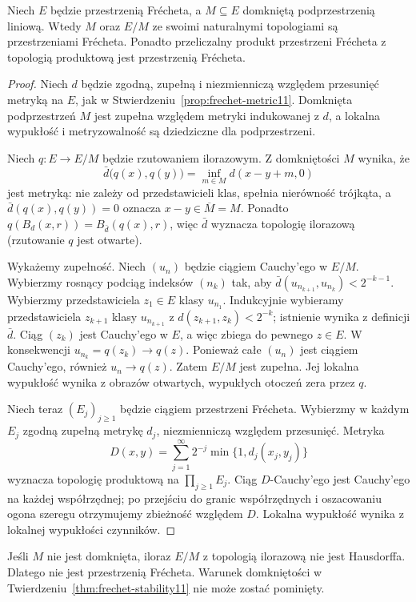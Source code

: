 \begin{twierdzenie}\label{thm:frechet-stability11}
Niech $E$ będzie przestrzenią Frécheta, a $M\subseteq E$
domkniętą podprzestrzenią liniową. Wtedy $M$ oraz $E/M$
ze swoimi naturalnymi topologiami są przestrzeniami Frécheta.
Ponadto przeliczalny produkt przestrzeni Frécheta z topologią
produktową jest przestrzenią Frécheta.
\end{twierdzenie}
\begin{proof}
Niech $d$ będzie zgodną, zupełną i niezmienniczą względem
przesunięć metryką na $E$, jak w Stwierdzeniu~\ref{prop:frechet-metric11}.
Domknięta podprzestrzeń $M$ jest zupełna względem metryki
indukowanej z $d$, a lokalna wypukłość i metryzowalność są
dziedziczne dla podprzestrzeni.

Niech $q:E\to E/M$ będzie rzutowaniem ilorazowym.
Z domkniętości $M$ wynika, że
\[
 \bar d\bigl(q(x),q(y)\bigr)=\inf_{m\in M}d(x-y+m,0)
\]
jest metryką: nie zależy od przedstawicieli klas, spełnia
nierówność trójkąta, a $\bar d(q(x),q(y))=0$ oznacza
$x-y\in\overline M=M$. Ponadto
$q(B_d(x,r))=B_{\bar d}(q(x),r)$, więc $\bar d$ wyznacza
topologię ilorazową (rzutowanie $q$ jest otwarte).

Wykażemy zupełność. Niech $(u_n)$ będzie ciągiem Cauchy'ego
w $E/M$. Wybierzmy rosnący podciąg indeksów $(n_k)$ tak,
aby $\bar d(u_{n_{k+1}},u_{n_k})<2^{-k-1}$.
Wybierzmy przedstawiciela $z_1\in E$ klasy $u_{n_1}$.
Indukcyjnie wybieramy przedstawiciela $z_{k+1}$ klasy
$u_{n_{k+1}}$ z $d(z_{k+1},z_k)<2^{-k}$;
istnienie wynika z definicji $\bar d$. Ciąg $(z_k)$
jest Cauchy'ego w $E$, a więc zbiega do pewnego $z\in E$.
W konsekwencji $u_{n_k}=q(z_k)\to q(z)$.
Ponieważ całe $(u_n)$ jest ciągiem Cauchy'ego,
również $u_n\to q(z)$. Zatem $E/M$ jest zupełna.
Jej lokalna wypukłość wynika z obrazów otwartych,
wypukłych otoczeń zera przez $q$.

Niech teraz $(E_j)_{j\ge1}$ będzie ciągiem przestrzeni Frécheta.
Wybierzmy w każdym $E_j$ zgodną zupełną metrykę
$d_j$, niezmienniczą względem przesunięć. Metryka
\[
 D(x,y)=\sum_{j=1}^\infty 2^{-j}\min\{1,d_j(x_j,y_j)\}
\]
wyznacza topologię produktową na $\prod_{j\ge1}E_j$.
Ciąg $D$-Cauchy'ego jest Cauchy'ego na każdej współrzędnej;
po przejściu do granic współrzędnych i oszacowaniu ogona szeregu
otrzymujemy zbieżność względem $D$. Lokalna wypukłość
wynika z lokalnej wypukłości czynników.
\end{proof}

\begin{uwaga}
Jeśli $M$ nie jest domknięta, iloraz $E/M$ z topologią
ilorazową nie jest Hausdorffa. Dlatego nie jest przestrzenią
Frécheta. Warunek domkniętości w Twierdzeniu~\ref{thm:frechet-stability11}
nie może zostać pominięty.
\end{uwaga}

